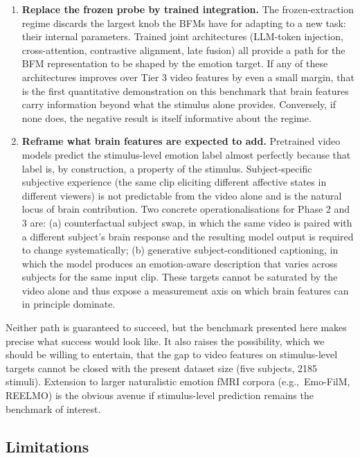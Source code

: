 \documentclass[11pt, a4paper]{article}
\newcommand{\eg}{e.g.,\ }
\begin{document}
\begin{enumerate}[leftmargin=1.4em, itemsep=4pt]
  \item \textbf{Replace the frozen probe by trained integration.}
        The frozen-extraction regime discards the largest knob the BFMs have for
        adapting to a new task: their internal parameters. Trained joint architectures
        (LLM-token injection, cross-attention, contrastive alignment, late fusion) all
        provide a path for the BFM representation to be shaped by the emotion target. If
        any of these architectures improves over Tier 3 video features by even a small
        margin, that is the first quantitative demonstration on this benchmark that brain
        features carry information beyond what the stimulus alone provides. Conversely,
        if none does, the negative result is itself informative about the regime.
  \item \textbf{Reframe what brain features are expected to add.}
        Pretrained video models predict the stimulus-level emotion label almost
        perfectly because that label is, by construction, a property of the stimulus.
        Subject-specific subjective experience (the same clip eliciting different
        affective states in different viewers) is not predictable from the video alone
        and is the natural locus of brain contribution. Two concrete operationalisations
        for Phase 2 and 3 are: (a) counterfactual subject swap, in which the same video
        is paired with a different subject's brain response and the resulting model
        output is required to change systematically; (b) generative subject-conditioned
        captioning, in which the model produces an emotion-aware description that varies
        across subjects for the same input clip. These targets cannot be saturated by
        the video alone and thus expose a measurement axis on which brain features can
        in principle dominate.
\end{enumerate}

Neither path is guaranteed to succeed, but the benchmark presented here makes precise
what success would look like. It also raises the possibility, which we should be willing
to entertain, that the gap to video features on stimulus-level targets cannot be closed
with the present dataset size (five subjects, 2185 stimuli). Extension to larger
naturalistic emotion fMRI corpora (\eg Emo-FilM, REELMO) is the obvious avenue if
stimulus-level prediction remains the benchmark of interest.

\subsection{Limitations}
\end{document}
